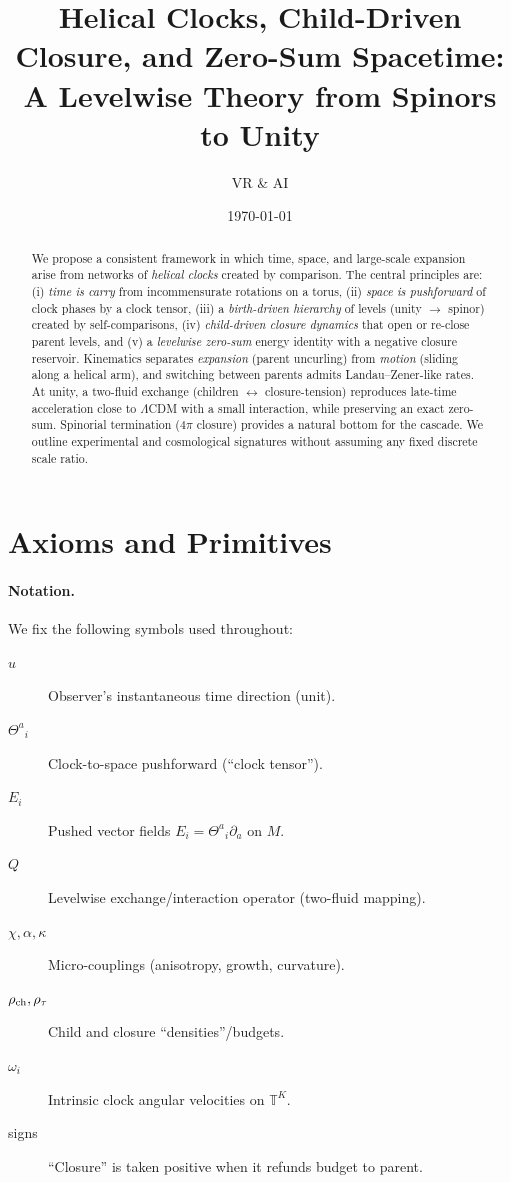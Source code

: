 \documentclass[11pt]{article}
\title{Helical Clocks, Child-Driven Closure, and Zero-Sum Spacetime:\\
A Levelwise Theory from Spinors to Unity}
\author{VR \& AI}
\date{\today}
\begin{document}
\maketitle

\begin{abstract}
We propose a consistent framework in which time, space, and large-scale expansion arise from networks of \emph{helical clocks} created by comparison. 
The central principles are: (i) \emph{time is carry} from incommensurate rotations on a torus, (ii) \emph{space is pushforward} of clock phases by a clock tensor, (iii) a \emph{birth-driven hierarchy} of levels (unity $\to$ spinor) created by self-comparisons, (iv) \emph{child-driven closure dynamics} that open or re-close parent levels, and (v) a \emph{levelwise zero-sum} energy identity with a negative closure reservoir. 
Kinematics separates \emph{expansion} (parent uncurling) from \emph{motion} (sliding along a helical arm), and switching between parents admits Landau--Zener-like rates. 
At unity, a two-fluid exchange (children $\leftrightarrow$ closure-tension) reproduces late-time acceleration close to $\Lambda$CDM with a small interaction, while preserving an exact zero-sum. 
Spinorial termination ($4\pi$ closure) provides a natural bottom for the cascade.
We outline experimental and cosmological signatures without assuming any fixed discrete scale ratio.
\end{abstract}

\tableofcontents

\section{Axioms and Primitives}

\paragraph{Notation.}
We fix the following symbols used throughout:
\begin{description}
\item[$u$] Observer's instantaneous time direction (unit).
\item[$\Theta^a{}_i$] Clock-to-space pushforward (``clock tensor'').
\item[$E_i$] Pushed vector fields $E_i=\Theta^a{}_i\partial_a$ on $M$.
\item[$Q$] Levelwise exchange/interaction operator (two-fluid mapping).
\item[$\chi,\alpha,\kappa$] Micro-couplings (anisotropy, growth, curvature).
\item[$\rho_{\rm ch},\rho_\tau$] Child and closure ``densities''/budgets.
\item[$\omega_i$] Intrinsic clock angular velocities on $\mathbb T^K$.
\item[signs] ``Closure'' is taken positive when it refunds budget to parent.
\end{description}
\end{document}
